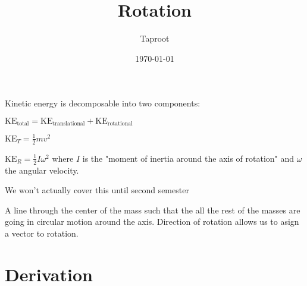 \documentclass[letterpaper]{article}
\author{Taproot}
\date{\today}
\title{Rotation}
\renewcommand{\tableofcontents}{}
\begin{document}
\tableofcontents

Kinetic energy is decomposable into two components:

\(\text{KE}_{\text{total}} = \text{KE}_{\text{translational}} + \text{KE}_{\text{rotational}}\)

\(\text{KE}_T  = \frac{1}{2} mv^2\)

\begin{aside}
\(\text{KE}_R = \frac{1}{2} I\omega^2\) where \(I\) is the "moment of inertia around the axis of rotation" and \(\omega\) the angular velocity.

We won't actually cover this until second semester
\end{aside}

\begin{defn}
A line through the center of the mass such that the all the rest of the masses are going in circular motion around the axis. Direction of rotation allows us to asign a vector to rotation.
\end{defn}

\section{Derivation}
\label{sec:org33fcad4}
\end{document}
